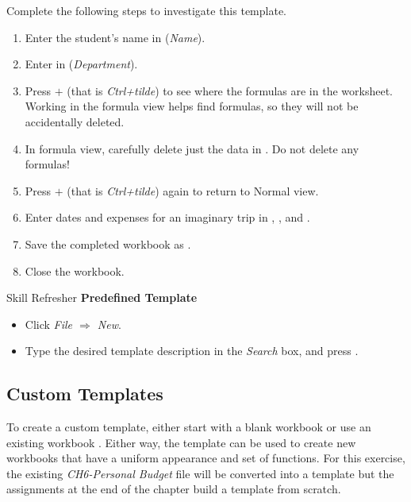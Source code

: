 Complete the following steps to investigate this template.

\begin{enumerate}
	\item Enter the student's name in  (\textit{Name}).
	\item Enter  in  (\textit{Department}).
	\item Press $+$\fmtKeystroke{$ \sim $} (that is \textit{Ctrl+tilde}) to see where the formulas are in the worksheet. Working in the formula view helps find formulas, so they will not be accidentally deleted.
	\item In formula view, carefully delete just the data in . Do not delete any formulas!
	\item Press $+$\fmtKeystroke{$ \sim $} (that is \textit{Ctrl+tilde}) again to return to Normal view.
	\item Enter dates and expenses for an imaginary trip in , , and .
	\item Save the completed workbook as . 
	\item Close the  workbook.
\end{enumerate}

\begin{center}
	\begin{sklbox}{Skill Refresher}
		\textbf{Predefined Template}
		\\
		\begin{itemize}
			\setlength{\itemsep}{0pt}
			\setlength{\parskip}{0pt}
			\setlength{\parsep}{0pt}

			\item Click \textit{File $ \Rightarrow $ New}.
			\item Type the desired template description in the \textit{Search} box, and press .
			
		\end{itemize}
	\end{sklbox}
\end{center}

\subsection{Custom Templates}

To create a custom template, either start with a blank workbook or use an existing workbook . Either way, the template can be used to create new workbooks that have a uniform appearance and set of functions. For this exercise, the existing \textit{CH6-Personal Budget} file will be converted into a template but the assignments at the end of the chapter build a template from scratch.

